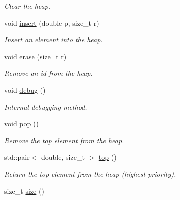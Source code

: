 \begin{DoxyCompactItemize}
\begin{DoxyCompactList}\small\item\em Clear the heap. \end{DoxyCompactList}\item 
void \hyperlink{classmerlin_1_1indexed__heap_ae28eb7d27ffe353598f9471c908dab26}{insert} (double p, size\+\_\+t r)
\begin{DoxyCompactList}\small\item\em Insert an element into the heap. \end{DoxyCompactList}\item 
void \hyperlink{classmerlin_1_1indexed__heap_a81b46a7ef4e2a01a478bcb40bb10f7c4}{erase} (size\+\_\+t r)
\begin{DoxyCompactList}\small\item\em Remove an id from the heap. \end{DoxyCompactList}\item 
\hypertarget{classmerlin_1_1indexed__heap_ae89fcb8f1e0de7ce20b7582877fc4720}{}void \hyperlink{classmerlin_1_1indexed__heap_ae89fcb8f1e0de7ce20b7582877fc4720}{debug} ()\label{classmerlin_1_1indexed__heap_ae89fcb8f1e0de7ce20b7582877fc4720}

\begin{DoxyCompactList}\small\item\em Internal debugging method. \end{DoxyCompactList}\item 
\hypertarget{classmerlin_1_1indexed__heap_ae9a7ae73911df2a7d5724b1253ea3fdb}{}void \hyperlink{classmerlin_1_1indexed__heap_ae9a7ae73911df2a7d5724b1253ea3fdb}{pop} ()\label{classmerlin_1_1indexed__heap_ae9a7ae73911df2a7d5724b1253ea3fdb}

\begin{DoxyCompactList}\small\item\em Remove the top element from the heap. \end{DoxyCompactList}\item 
\hypertarget{classmerlin_1_1indexed__heap_a53f02b83181ec59ee68582d3df5c5986}{}std\+::pair$<$ double, size\+\_\+t $>$ \hyperlink{classmerlin_1_1indexed__heap_a53f02b83181ec59ee68582d3df5c5986}{top} ()\label{classmerlin_1_1indexed__heap_a53f02b83181ec59ee68582d3df5c5986}

\begin{DoxyCompactList}\small\item\em Return the top element from the heap (highest priority). \end{DoxyCompactList}\item 
\hypertarget{classmerlin_1_1indexed__heap_a8b65813fb7de2b0ae547685f72bddd5c}{}size\+\_\+t \hyperlink{classmerlin_1_1indexed__heap_a8b65813fb7de2b0ae547685f72bddd5c}{size} ()\label{classmerlin_1_1indexed__heap_a8b65813fb7de2b0ae547685f72bddd5c}


\end{DoxyCompactItemize}

